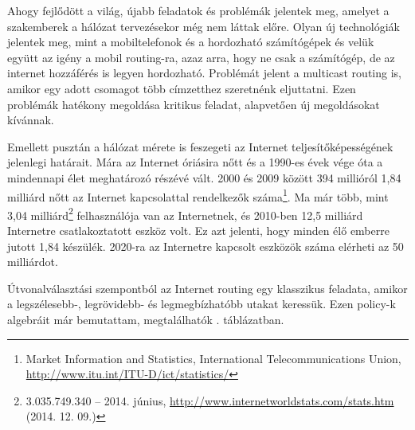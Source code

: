   Ahogy fejlődött a világ, újabb feladatok és problémák jelentek meg, amelyet a szakemberek a hálózat tervezésekor még nem láttak előre. Olyan új technológiák jelentek meg, mint a mobiltelefonok és a hordozható számítógépek és velük együtt az igény a mobil routing-ra, azaz arra, hogy ne csak a számítógép, de az internet hozzáférés is legyen hordozható. Problémát jelent a multicast routing is, amikor egy adott csomagot több címzetthez szeretnénk eljuttatni. Ezen problémák hatékony megoldása kritikus feladat, alapvetően új megoldásokat kívánnak.

  Emellett pusztán a hálózat mérete is feszegeti az Internet teljesítőképességének jelenlegi határait. Mára az Internet óriásira nőtt és a 1990-es évek vége óta a mindennapi élet meghatározó részévé vált. 2000 és 2009 között 394 millióról 1,84 milliárd nőtt az Internet kapcsolattal rendelkezők száma\footnote{Market Information and Statistics, International Telecommunications Union, \url{http://www.itu.int/ITU-D/ict/statistics/}}. Ma már több, mint 3,04 milliárd\footnote{3.035.749.340 -- 2014. június, \url{http://www.internetworldstats.com/stats.htm} (2014. 12. 09.)} felhasználója van az Internetnek, és 2010-ben 12,5 milliárd Internetre csatlakoztatott eszköz volt. Ez azt jelenti, hogy minden élő emberre jutott 1,84 készülék. 2020-ra az Internetre kapcsolt eszközök száma elérheti az 50 milliárdot\cite{The_Internet_of_Things}.

  Útvonalválasztási szempontból az Internet routing egy klasszikus feladata, amikor a legszélesebb-, legrövidebb- és legmegbízhatóbb utakat keressük. Ezen policy-k algebráit már bemutattam, megtalálhatók . táblázatban.

